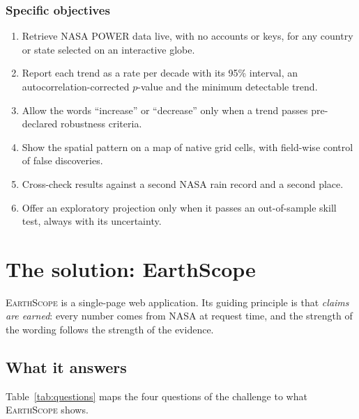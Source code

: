 \documentclass[12pt, oneside, openany]{report}
\newcommand{\EarthScope}{\textsc{EarthScope}}
\begin{document}
\subsection*{Specific objectives}
\begin{enumerate}[leftmargin=*]
    \item Retrieve NASA POWER data live, with no accounts or keys, for any country or state selected on an interactive globe.
    \item Report each trend as a rate per decade with its 95\% interval, an autocorrelation-corrected $p$-value and the minimum detectable trend.
    \item Allow the words \enquote{increase} or \enquote{decrease} only when a trend passes pre-declared robustness criteria.
    \item Show the spatial pattern on a map of native grid cells, with field-wise control of false discoveries.
    \item Cross-check results against a second NASA rain record and a second place.
    \item Offer an exploratory projection only when it passes an out-of-sample skill test, always with its uncertainty.
\end{enumerate}

\chapter{The solution: EarthScope}\label{cap:solution}

\EarthScope{} \cite{earthscope} is a single-page web application. Its guiding principle is that \emph{claims are earned}: every number comes from NASA at request time, and the strength of the wording follows the strength of the evidence.

\section{What it answers}

Table~\ref{tab:questions} maps the four questions of the challenge to what \EarthScope{} shows.
\end{document}
